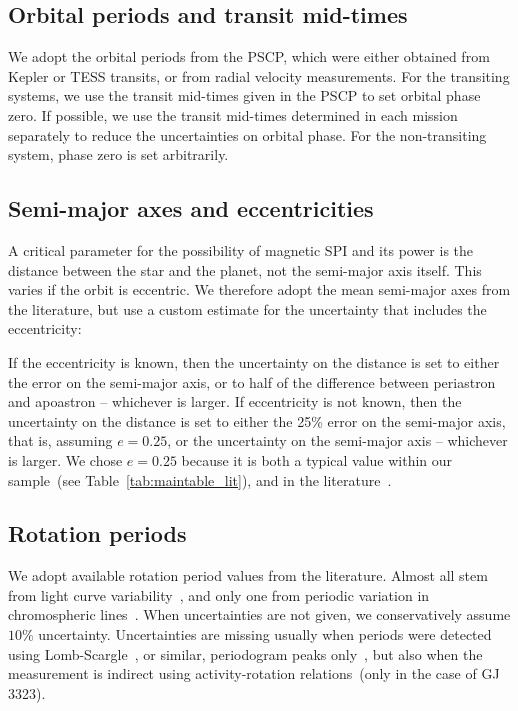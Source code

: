 \documentclass[twocolumn]{aastex631}
\begin{document}
\subsection{Orbital periods and transit mid-times}
\label{sec:data:orbitalperiod}
We adopt the orbital periods from the PSCP, which were either obtained from Kepler or TESS transits, or from radial velocity measurements. For the transiting systems, we use the transit mid-times given in the PSCP to set orbital phase zero. If possible, we use the transit mid-times determined in each mission separately to reduce the uncertainties on orbital phase. For the non-transiting system, phase zero is set arbitrarily.
\subsection{Semi-major axes and eccentricities}
\label{sec:data:a}
A critical parameter for the possibility of magnetic SPI and its power is the distance between the star and the planet, not the semi-major axis itself. This varies if the orbit is eccentric. We therefore adopt the mean semi-major axes from the literature, but use a custom estimate for the uncertainty that includes the eccentricity:

If the eccentricity is known, then the uncertainty on the distance is set to either the error on the semi-major axis, or to half of the difference between periastron and apoastron -- whichever is larger. If eccentricity is not known, then the uncertainty on the distance is set to either the 25\% error on the semi-major axis, that is, assuming $e=0.25$, or the uncertainty on the semi-major axis -- whichever is larger. We chose $e=0.25$ because it is both a typical value within our sample~(see Table~\ref{tab:maintable_lit}), and in the literature~\citep{eylen2019orbital}.

\subsection{Rotation periods}
\label{sec:data:rotationperiods}
We adopt available rotation period values from the literature. Almost all stem from light curve variability~\citep{angus2018inferring, mazeh2015photometric, mcquillan2013stellar, mcquillan2014rotation, luger2017sevenplanet, stock2020carmenes, deleon202137, torres2017validation, stefansson2020habitable, zicher2022one, ment2021toi, rizzuto2020tess, gunther2020stellar}, and only one from periodic variation in chromospheric lines~\citep{demangeon2021warm}. When uncertainties are not given, we conservatively assume $10\%$ uncertainty. Uncertainties are missing usually when periods were detected using Lomb-Scargle~\citep{lomb1976leastsquares, scargle1982studies}, or similar, periodogram peaks only~\citep{gunther2020stellar, kiraga2007agerotationactivity, grankin2013magnetically, burt2014lickcarnegie}, but also when the measurement is indirect using activity-rotation relations~(only in the case of GJ 3323).
\end{document}
